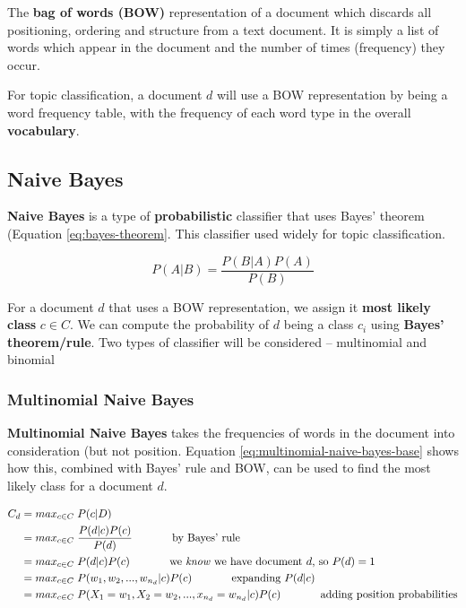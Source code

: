 \documentclass{article}
\begin{document}
The \textbf{bag of words (BOW)} representation of a document which discards all positioning, ordering and structure from a text document. It is simply a list of words which appear in the document and the number of times (frequency) they occur.

For topic classification, a document $d$ will use a BOW representation by being a word frequency table, with the frequency of each word type in the overall \textbf{vocabulary}.

\subsection{Naive Bayes}

\textbf{Naive Bayes} is a type of \textbf{probabilistic} classifier that uses Bayes' theorem (Equation \ref{eq:bayes-theorem}. This classifier used widely for topic classification.

\begin{equation}
	P(A|B) = \frac{P(B|A) P(A)}{P(B)}
	\label{eq:bayes-theorem}
\end{equation}

For a document $d$ that uses a BOW representation, we assign it \textbf{most likely class} $c \in C$. We can compute the probability of $d$ being a class $c_i$ using \textbf{Bayes' theorem/rule}. Two types of classifier will be considered -- multinomial and binomial

\subsubsection{Multinomial Naive Bayes}

\textbf{Multinomial Naive Bayes} takes the frequencies of words in the document into consideration (but not position. Equation \ref{eq:multinomial-naive-bayes-base} shows how this, combined with Bayes' rule and BOW, can be used to find the most likely class for a document $d$.
 
\begin{equation}
\begin{aligned}[b]
	C_{d} &= max_{c \in C} \; P(c|D) \\
	&= max_{c \in C} \; \frac{P(d|c)P(c)}{P(d)} 
	\;\;\;\;\;\;\;\;\;\;\;\;\; \text{by Bayes' rule} \\
	&= max_{c \in C} \; P(d|c)P(c) 
	\;\;\;\;\;\;\;\;\;\;\;\;\; \text{we \textit{know} we have document }d\text{, so } P(d) = 1 \\
	&= max_{c \in C} \; P(w_1,w_2,...,w_{n_d}| c)P(c)
	\;\;\;\;\;\;\;\;\;\;\;\;\; \text{expanding }P(d|c) \\	
	&= max_{c \in C} \; P(X_1 = w_1, X_2 = w_2, ..., x_{n_d} = w_{n_d} | c)P(c)
	\;\;\;\;\;\;\;\;\;\;\;\;\; \text{adding position probabilities} \\
\end{aligned}
\label{eq:multinomial-naive-bayes-base}
\end{equation}
\end{document}
